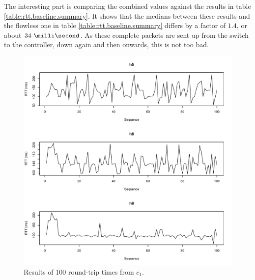 The interesting part is comparing the combined values against the results in
table  \vref{table:rtt.baseline.summary}.  It shows that the medians between
these results and the flowless one in table \ref{table:rtt.baseline.summary}
differs by a factor of $1.4$, or about $\ms{34}$.  As these complete packets
are sent up from the switch to the controller, down again and then onwards,
    this is not too bad.

\begin{figure}
  \centering
  \includegraphics[width=\textwidth]{rtt-hosts.pdf}
  \caption{Results of 100 round-trip times from $c_1$.}
  \label{figure:paxos.ctrl.results}
\end{figure}

